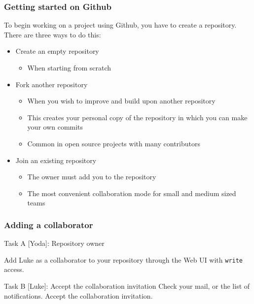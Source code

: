\begin{frame}

\frametitle{Getting started on Github}

To begin working on a project using Github, you have to create a repository. There are three ways to do this:


\begin{itemize}
	\item Create an empty repository
	\begin{itemize}
	\item When starting from scratch
	\end{itemize}	
	
	\medskip
	\item Fork another repository
	\begin{itemize}
	\item When you wish to improve and build upon another repository
	\item This creates your personal copy of the repository in which you can make your own commits
	\item Common in open source projects with many contributors
	\end{itemize}
	
	\medskip
	\item Join an existing repository
	\begin{itemize}
	\item The owner must add you to the repository
	\item The most convenient collaboration mode for small and medium sized teams
	\end{itemize}
\end{itemize}

\end{frame}


\begin{frame}[fragile]

\frametitle{Adding a collaborator}

\begin{block}{Task A [Yoda]: Repository owner}

	Add Luke as a collaborator to your repository through the Web UI with \texttt{write} access.
\end{block}

\begin{block}{Task B [Luke]: Accept the collaboration invitation}
Check your mail, or the list of notifications. Accept the collaboration invitation.
\end{block}

\end{frame}

